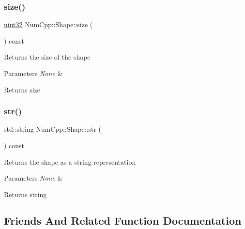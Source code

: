 \subsubsection{\texorpdfstring{size()}{size()}}
{\footnotesize\ttfamily \mbox{\hyperlink{namespace_num_cpp_a36f388e948380413c63011cab9b7fbd5}{uint32}} Num\+Cpp\+::\+Shape\+::size (\begin{DoxyParamCaption}{ }\end{DoxyParamCaption}) const\hspace{0.3cm}{\ttfamily [inline]}}

Returns the size of the shape


\begin{DoxyParams}{Parameters}
{\em None} & \\
\hline
\end{DoxyParams}
\begin{DoxyReturn}{Returns}
size 
\end{DoxyReturn}
\mbox{\label{class_num_cpp_1_1_shape_a83449c64eb5e4a1df88fe13288507340}} 
\subsubsection{\texorpdfstring{str()}{str()}}
{\footnotesize\ttfamily std\+::string Num\+Cpp\+::\+Shape\+::str (\begin{DoxyParamCaption}{ }\end{DoxyParamCaption}) const\hspace{0.3cm}{\ttfamily [inline]}}

Returns the shape as a string representation


\begin{DoxyParams}{Parameters}
{\em None} & \\
\hline
\end{DoxyParams}
\begin{DoxyReturn}{Returns}
string 
\end{DoxyReturn}


\subsection{Friends And Related Function Documentation}
\mbox{\label{class_num_cpp_1_1_shape_a520d818f31bbdacdf8cfbe6de9e88a28}} 
